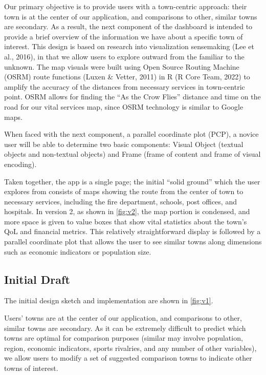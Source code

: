 \documentclass[print]{nuthesis}
\begin{document}
Our primary objective is to provide users with a town-centric approach: their town is at the center of our application, and comparisons to other, similar towns are secondary. As a result, the next component of the dashboard is intended to provide a brief overview of the information we have about a specific town of interest. This design is based on research into visualization sensemaking (Lee et al., 2016), in that we allow users to explore outward from the familiar to the unknown. The map visuals were built using Open Source Routing Machine (OSRM) route functions (Luxen \& Vetter, 2011) in R (R Core Team, 2022) to amplify the accuracy of the distances from necessary services in town-centric point. OSRM allows for finding the ``As the Crow Flies'' distance and time on the road for our vital services map, since OSRM technology is similar to Google maps.

When faced with the next component, a parallel coordinate plot (PCP), a novice user will be able to determine two basic components: Visual Object (textual objects and non-textual objects) and Frame (frame of content and frame of visual encoding).

Taken together, the app is a single page; the initial ``solid ground'' which the user explores from consists of maps showing the route from the center of town to necessary services, including the fire department, schools, post offices, and hospitals. In version 2, as shown in \autoref{fig:v2}, the map portion is condensed, and more space is given to value boxes that show vital statistics about the town's QoL and financial metrics. This relatively straightforward display is followed by a parallel coordinate plot that allows the user to see similar towns along dimensions such as economic indicators or population size.

\hypertarget{initial-draft}{%
\subsection{Initial Draft}\label{initial-draft}}

The initial design sketch and implementation are shown in \autoref{fig:v1}.

Users' towns are at the center of our application, and comparisons to other, similar towns are secondary. As it can be extremely difficult to predict which towns are optimal for comparison purposes (similar may involve population, region, economic indicators, sports rivalries, and any number of other variables), we allow users to modify a set of suggested comparison towns to indicate other towns of interest.
\end{document}
